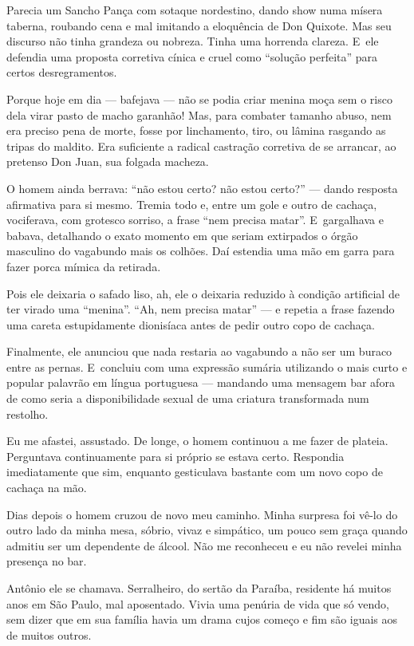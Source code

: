 Parecia um Sancho Pança com sotaque nordestino, dando show numa mísera
taberna, roubando cena e mal imitando a eloquência de Don Quixote. Mas
seu discurso não tinha grandeza ou nobreza. Tinha uma horrenda clareza.
E~ele defendia uma proposta corretiva cínica e cruel como ``solução
perfeita'' para certos desregramentos.

Porque hoje em dia --- bafejava --- não se podia criar menina moça sem o
risco dela virar pasto de macho garanhão! Mas, para combater tamanho
abuso, nem era preciso pena de morte, fosse por linchamento, tiro, ou
lâmina rasgando as tripas do maldito. Era suficiente a radical castração
corretiva de se arrancar, ao pretenso Don Juan, sua folgada macheza.

O homem ainda berrava: ``não estou certo? não estou certo?'' --- dando
resposta afirmativa para si mesmo. Tremia todo e, entre um gole e outro
de cachaça, vociferava, com grotesco sorriso, a frase ``nem precisa
matar''. E~gargalhava e babava, detalhando o exato momento em que seriam
extirpados o órgão masculino do vagabundo mais os colhões. Daí estendia
uma mão em garra para fazer porca mímica da retirada.

Pois ele deixaria o safado liso, ah, ele o deixaria reduzido à condição
artificial de ter virado uma ``menina''. ``Ah, nem precisa matar'' --- e
repetia a frase fazendo uma careta estupidamente dionisíaca antes de
pedir outro copo de cachaça.

Finalmente, ele anunciou que nada restaria ao vagabundo a não ser um
buraco entre as pernas. E~concluiu com uma expressão sumária utilizando
o mais curto e popular palavrão em língua portuguesa --- mandando uma
mensagem bar afora de como seria a disponibilidade sexual de uma
criatura transformada num restolho.

Eu me afastei, assustado. De longe, o homem continuou a me fazer de
plateia. Perguntava continuamente para si próprio se estava certo.
Respondia imediatamente que sim, enquanto gesticulava bastante com um
novo copo de cachaça na mão.

\asterisc{}

Dias depois o homem cruzou de novo meu caminho. Minha surpresa foi vê-lo
do outro lado da minha mesa, sóbrio, vivaz e simpático, um pouco sem
graça quando admitiu ser um dependente de álcool. Não me reconheceu e eu
não revelei minha presença no bar.

Antônio ele se chamava. Serralheiro, do sertão da Paraíba, residente há
muitos anos em São Paulo, mal aposentado. Vivia uma penúria de vida que
só vendo, sem dizer que em sua família havia um drama cujos começo e fim
são iguais aos de muitos outros.

